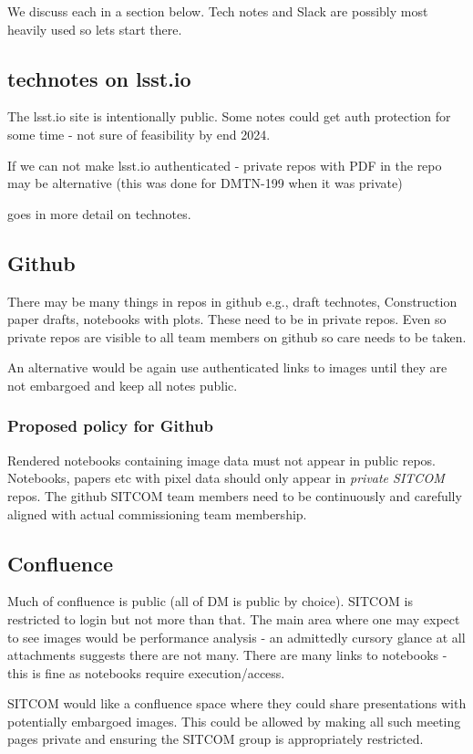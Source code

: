We discuss each in a section below.
Tech notes and Slack are possibly most heavily used so lets start there.



\subsection{technotes on lsst.io}
The lsst.io site is intentionally public.
Some notes could get auth protection for some time - not sure of feasibility by end 2024.

If we can not make lsst.io authenticated - private repos with PDF in the repo may be alternative (this was done for DMTN-199 when it was private)

 goes in more detail on technotes.


\subsection{Github }
There may be many things in repos in github e.g., draft technotes, Construction paper drafts, notebooks with plots.
These need to be in private repos.
Even so private repos are visible to all team members on github so care needs to be taken.

An alternative would be again use authenticated links to images until they are not embargoed and keep all notes public.

\subsubsection{Proposed policy for Github}
Rendered notebooks containing image data must not appear in public repos.
Notebooks, papers etc with pixel data should only appear in \emph{private SITCOM} repos.
The github SITCOM team members need to be continuously and carefully aligned with actual commissioning team membership.

\subsection{Confluence}
Much of confluence is public (all of DM is public by choice).
SITCOM is restricted to login but not more than that.
The main area where one may expect to see images would be performance analysis - an admittedly  cursory glance at all attachments suggests there are not many.
There are many links to notebooks - this is fine as notebooks require execution/access.

SITCOM would like a confluence space where they could share presentations with potentially embargoed images.
This could be allowed by making all such meeting pages private and ensuring the SITCOM group is appropriately restricted.

